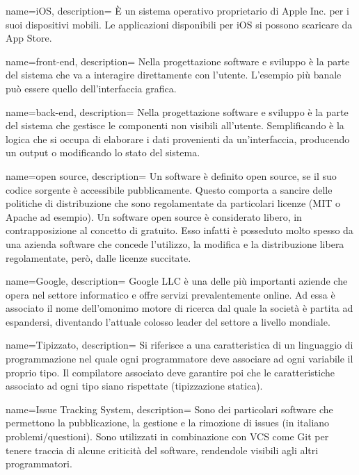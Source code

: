 {
  name=iOS,
  description={ È un sistema operativo proprietario di Apple Inc. per i suoi dispositivi mobili. Le applicazioni disponibili per iOS si
  possono scaricare da App Store.}
}

{
  name=front-end,
  description={ Nella progettazione software e sviluppo è la parte del sistema che va a interagire direttamente con l'utente. L'esempio più
  banale può essere quello dell'interfaccia grafica. }
}

{
  name=back-end,
  description={ Nella progettazione software e sviluppo è la parte del sistema che gestisce le componenti non visibili all'utente.
  Semplificando è la logica che si occupa di elaborare i dati provenienti da un'interfaccia, producendo un output o modificando lo stato del
  sistema. }
}

{
  name=open source,
  description={ Un software è definito open source, se il suo codice sorgente è accessibile pubblicamente. Questo comporta a sancire delle politiche di
  distribuzione che sono regolamentate da particolari licenze (MIT o Apache ad esempio). Un software open source è considerato libero, in
  contrapposizione al concetto di gratuito. Esso infatti è posseduto molto spesso da una azienda software che concede l'utilizzo, la
  modifica e la distribuzione libera regolamentate, però, dalle licenze succitate.  }
}

{
  name=Google,
  description={ Google LLC è una delle più importanti aziende che opera nel settore informatico e offre servizi prevalentemente online. Ad
  essa è associato il nome dell'omonimo motore di ricerca dal quale la società è partita ad espandersi, diventando l'attuale colosso leader
  del settore a livello mondiale.  }
}

{
  name=Tipizzato,
  description= { Si riferisce a una caratteristica di un linguaggio di programmazione nel quale ogni programmatore deve associare ad ogni
  variabile il proprio tipo. Il compilatore associato deve garantire poi che le caratteristiche associato ad ogni tipo siano rispettate
  (tipizzazione statica).  }
}

{
  name=Issue Tracking System,
  description={ Sono dei particolari software che permettono la pubblicazione, la gestione e la rimozione di issues (in italiano
  problemi/questioni). Sono utilizzati in combinazione con VCS come Git per tenere traccia di alcune criticità del software, rendendole
  visibili agli altri programmatori. }
}

